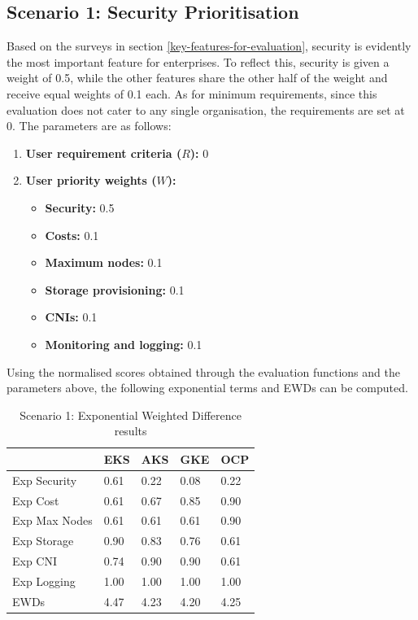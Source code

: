\subsection{Scenario 1: Security Prioritisation}

Based on the surveys in section \ref{key-features-for-evaluation}, security is evidently the most important feature for enterprises. To reflect this, security is given a weight of 0.5, while the other features share the other half of the weight and receive equal weights of 0.1 each. As for minimum requirements, since this evaluation does not cater to any single organisation, the requirements are set at 0. The parameters are as follows:

\begin{enumerate}
\def\labelenumi{\arabic{enumi}.}
\tightlist
\item
  \textbf{User requirement criteria (\(R\)):} 0
\item
  \textbf{User priority weights (\(W\)):}

  \begin{itemize}
  \tightlist
  \item
    \textbf{Security:} 0.5
  \item
    \textbf{Costs:} 0.1
  \item
    \textbf{Maximum nodes:} 0.1
  \item
    \textbf{Storage provisioning:} 0.1
  \item
    \textbf{CNIs:} 0.1
  \item
    \textbf{Monitoring and logging:} 0.1
  \end{itemize}
\end{enumerate}

Using the normalised scores obtained through the evaluation functions and the parameters above, the following exponential terms and EWDs can be computed.

\begin{table}[!ht]
    \centering
    \begin{tabular}{|p{4cm}|p{2cm}|p{2cm}|p{2cm}|p{2cm}|} %
    \hline
 & EKS& AKS& GKE& OCP\\ \hline
        Exp Security & 0.61 & 0.22 & 0.08 & 0.22 \\ \hline
        Exp Cost & 0.61 & 0.67 & 0.85 & 0.90 \\ \hline
        Exp Max Nodes & 0.61 & 0.61 & 0.61 & 0.90 \\ \hline
        Exp Storage & 0.90 & 0.83 & 0.76 & 0.61 \\ \hline
        Exp CNI & 0.74 & 0.90 & 0.90 & 0.61 \\ \hline
        Exp Logging & 1.00 & 1.00 & 1.00 & 1.00 \\ \hline
 EWDs& 4.47& 4.23& 4.20&4.25\\\hline
    \end{tabular}
    \caption{Scenario 1: Exponential Weighted Difference results} 
    \label{tab:scenario-1-ewds}
\end{table}

